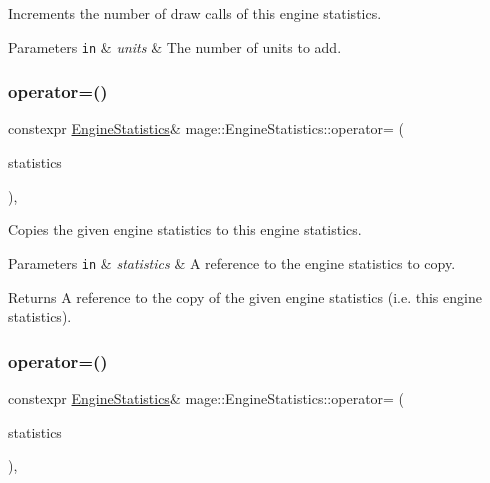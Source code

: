 Increments the number of draw calls of this engine statistics.


\begin{DoxyParams}[1]{Parameters}
\mbox{\tt in}  & {\em units} & The number of units to add. \\
\hline
\end{DoxyParams}
\hypertarget{classmage_1_1_engine_statistics_a98d201b7ecde677733d19a128cf7bdc6}{}\label{classmage_1_1_engine_statistics_a98d201b7ecde677733d19a128cf7bdc6} 
\subsubsection{\texorpdfstring{operator=()}{operator=()}\hspace{0.1cm}{\footnotesize\ttfamily [1/2]}}
{\footnotesize\ttfamily constexpr \hyperlink{classmage_1_1_engine_statistics}{Engine\+Statistics}\& mage\+::\+Engine\+Statistics\+::operator= (\begin{DoxyParamCaption}\item[{const \hyperlink{classmage_1_1_engine_statistics}{Engine\+Statistics} \&}]{statistics }\end{DoxyParamCaption})\hspace{0.3cm}{\ttfamily [default]}, {\ttfamily [noexcept]}}

Copies the given engine statistics to this engine statistics.


\begin{DoxyParams}[1]{Parameters}
\mbox{\tt in}  & {\em statistics} & A reference to the engine statistics to copy. \\
\hline
\end{DoxyParams}
\begin{DoxyReturn}{Returns}
A reference to the copy of the given engine statistics (i.\+e. this engine statistics). 
\end{DoxyReturn}
\hypertarget{classmage_1_1_engine_statistics_acde0bf9a215610270cca376a615d083e}{}\label{classmage_1_1_engine_statistics_acde0bf9a215610270cca376a615d083e} 
\subsubsection{\texorpdfstring{operator=()}{operator=()}\hspace{0.1cm}{\footnotesize\ttfamily [2/2]}}
{\footnotesize\ttfamily constexpr \hyperlink{classmage_1_1_engine_statistics}{Engine\+Statistics}\& mage\+::\+Engine\+Statistics\+::operator= (\begin{DoxyParamCaption}\item[{\hyperlink{classmage_1_1_engine_statistics}{Engine\+Statistics} \&\&}]{statistics }\end{DoxyParamCaption})\hspace{0.3cm}{\ttfamily [default]}, {\ttfamily [noexcept]}}

